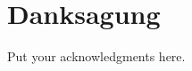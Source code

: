 





\begingroup
\let\clearpage\relax
\let\cleardoublepage\relax
\let\cleardoublepage\relax
\chapter*{Danksagung}
Put your acknowledgments here.


\endgroup



